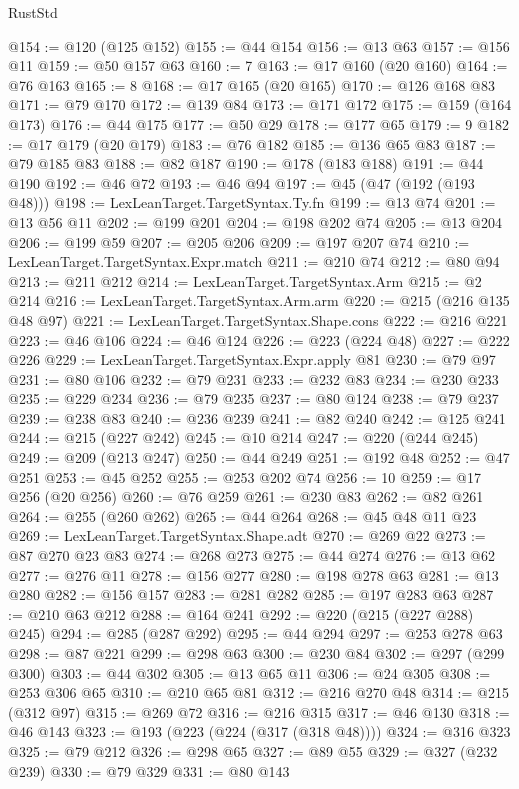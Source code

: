 \begin{lexlean}{RustStd}
\begin{coremodule}
@154 := @120 (@125 @152)
@155 := @44 @154
@156 := @13 @63
@157 := @156 @11
@159 := @50 @157 @63
@160 := 7
@163 := @17 @160 (@20 @160)
@164 := @76 @163
@165 := 8
@168 := @17 @165 (@20 @165)
@170 := @126 @168 @83
@171 := @79 @170
@172 := @139 @84
@173 := @171 @172
@175 := @159 (@164 @173)
@176 := @44 @175
@177 := @50 @29
@178 := @177 @65
@179 := 9
@182 := @17 @179 (@20 @179)
@183 := @76 @182
@185 := @136 @65 @83
@187 := @79 @185 @83
@188 := @82 @187
@190 := @178 (@183 @188)
@191 := @44 @190
@192 := @46 @72
@193 := @46 @94
@197 := @45 (@47 (@192 (@193 @48)))
@198 := LexLeanTarget.TargetSyntax.Ty.fn
@199 := @13 @74
@201 := @13 @56 @11
@202 := @199 @201
@204 := @198 @202 @74
@205 := @13 @204
@206 := @199 @59
@207 := @205 @206
@209 := @197 @207 @74
@210 := LexLeanTarget.TargetSyntax.Expr.match
@211 := @210 @74
@212 := @80 @94
@213 := @211 @212
@214 := LexLeanTarget.TargetSyntax.Arm
@215 := @2 @214
@216 := LexLeanTarget.TargetSyntax.Arm.arm
@220 := @215 (@216 @135 @48 @97)
@221 := LexLeanTarget.TargetSyntax.Shape.cons
@222 := @216 @221
@223 := @46 @106
@224 := @46 @124
@226 := @223 (@224 @48)
@227 := @222 @226
@229 := LexLeanTarget.TargetSyntax.Expr.apply @81
@230 := @79 @97
@231 := @80 @106
@232 := @79 @231
@233 := @232 @83
@234 := @230 @233
@235 := @229 @234
@236 := @79 @235
@237 := @80 @124
@238 := @79 @237
@239 := @238 @83
@240 := @236 @239
@241 := @82 @240
@242 := @125 @241
@244 := @215 (@227 @242)
@245 := @10 @214
@247 := @220 (@244 @245)
@249 := @209 (@213 @247)
@250 := @44 @249
@251 := @192 @48
@252 := @47 @251
@253 := @45 @252
@255 := @253 @202 @74
@256 := 10
@259 := @17 @256 (@20 @256)
@260 := @76 @259
@261 := @230 @83
@262 := @82 @261
@264 := @255 (@260 @262)
@265 := @44 @264
@268 := @45 @48 @11 @23
@269 := LexLeanTarget.TargetSyntax.Shape.adt
@270 := @269 @22
@273 := @87 @270 @23 @83
@274 := @268 @273
@275 := @44 @274
@276 := @13 @62
@277 := @276 @11
@278 := @156 @277
@280 := @198 @278 @63
@281 := @13 @280
@282 := @156 @157
@283 := @281 @282
@285 := @197 @283 @63
@287 := @210 @63 @212
@288 := @164 @241
@292 := @220 (@215 (@227 @288) @245)
@294 := @285 (@287 @292)
@295 := @44 @294
@297 := @253 @278 @63
@298 := @87 @221
@299 := @298 @63
@300 := @230 @84
@302 := @297 (@299 @300)
@303 := @44 @302
@305 := @13 @65 @11
@306 := @24 @305
@308 := @253 @306 @65
@310 := @210 @65 @81
@312 := @216 @270 @48
@314 := @215 (@312 @97)
@315 := @269 @72
@316 := @216 @315
@317 := @46 @130
@318 := @46 @143
@323 := @193 (@223 (@224 (@317 (@318 @48))))
@324 := @316 @323
@325 := @79 @212
@326 := @298 @65
@327 := @89 @55
@329 := @327 (@232 @239)
@330 := @79 @329
@331 := @80 @143

\end{coremodule}
\end{lexlean}
